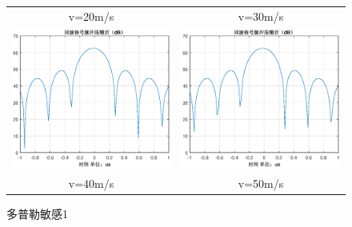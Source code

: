 \documentclass[12pt]{article}
\begin{document}
\begin{figure}[htbp]
\begin{tabular}{cc}
    v=20m/s&v=30m/s\\
  \includegraphics[width=.5\textwidth]{Doppler_sensitivity_0040}&\includegraphics[width=.5\textwidth]{Doppler_sensitivity_0050}\\
    v=40m/s&v=50m/s\\
  \end{tabular}
  \caption{多普勒敏感1}\label{Doppler_sensitivity_0000}
\end{figure}
\end{document}
